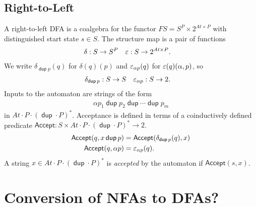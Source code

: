 \documentclass{article}
\newcommand\At{\ensuremath{\mathit{At}}}
\newcommand\pdup{\mathop{\mathsf{dup}}}
\renewcommand\star{^{\textstyle *}}
\newcommand\acc{\mathsf{Accept}}
\begin{document}
\subsection*{Right-to-Left}

A right-to-left DFA is a coalgebra for the functor $FS = S^{P}\times 2^{\At\times P}$ with distinguished start state $s\in S$. The structure map is a pair of functions
\begin{align*}
\delta &: S\to S^{P} & \eps &: S\to 2^{\At\times P}.
\end{align*}
We write $\delta_{\pdup p}(q)$ for $\delta(q)(p)$ and $\varepsilon_{\alpha p}(q)$ for $\varepsilon(q)(\alpha,p)$, so
\begin{align*}
\delta_{\pdup p} &: S\to S & \eps_{\alpha p} &: S\to 2.
\end{align*}
Inputs to the automaton are strings of the form
\begin{align*}
\alpha p_1\pdup p_2\pdup\cdots\pdup p_m
\end{align*}
in $\At\cdot P\cdot(\pdup\cdot P)\star$. Acceptance is defined in terms of a coinductively defined predicate $\acc:S\times\At\cdot P\cdot(\pdup\cdot P)\star\to 2$.
\begin{align*}
\acc(q,x\pdup p) &= \acc(\delta_{\pdup p}(q),x)\\
\acc(q,\alpha p) &= \eps_{\alpha p}(q).
\end{align*}
A string $x\in\At\cdot P\cdot(\pdup\cdot P)\star$ is \emph{accepted} by the automaton if $\acc(s,x)$.

\section*{Conversion of NFAs to DFAs?}
\end{document}
